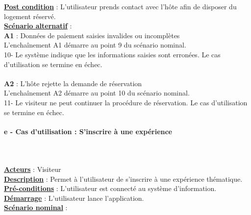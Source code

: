 \begin{flushleft}
\underline{\textbf{Post condition}} : L’utilisateur prends contact avec l'hôte afin de disposer du logement réservé.
\\\underline{\textbf{Scénario alternatif}} :
\\\textbf{A1} : Données de paiement saisies invalides ou incomplètes
\\L'enchaînement A1 démarre au point 9 du scénario nominal.
\\10- Le système indique que les informations saisies sont erronées. Le cas d’utilisation se termine en échec.
\\$ $\\\textbf{A2} : L'hôte rejette la demande de réservation
\\L'enchaînement A2 démarre au point 10 du scénario nominal.
\\11- Le visiteur ne peut continuer la procédure de réservation. Le cas d’utilisation se termine en échec.
\end{flushleft}

\paragraph{e - Cas d'utilisation : S’inscrire à une expérience}
$ $\\$ $\\\underline{\textbf{Acteurs}} : Visiteur
\\\underline{\textbf{Description}} : Permet à l’utilisateur de s’inscrire à une expérience thématique.
\\\underline{\textbf{Pré-conditions}} : L'utilisateur est connecté au système d’information.
\\\underline{\textbf{Démarrage}} : L’utilisateur lance l’application.
\\\underline{\textbf{Scénario nominal}} :

